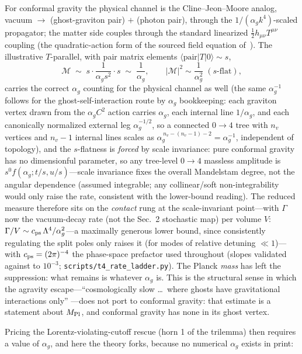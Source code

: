 \documentclass[11pt]{article}
\theoremstyle{definition}
\theoremstyle{remark}
\newcommand{\ag}{\alpha_g}
\begin{document}
For conformal gravity the physical channel is the
Cline--Jeon--Moore analog, vacuum $\to$ (ghost-graviton pair) $+$
(photon pair), through the $1/(\ag k^{4})$-scaled propagator; the
matter side couples through the standard linearized
$\tfrac12 h_{\mu\nu}T^{\mu\nu}$ coupling (the quadratic-action form
of the sourced field equation of~\cite{Mannheim2011}). The
illustrative $T$-parallel, with pair matrix elements
$\langle\text{pair}|T|0\rangle\sim s$,
\begin{equation}
\mathcal M\;\sim\;s\cdot\frac{1}{\ag s^{2}}\cdot s\;\sim\;
\frac{1}{\ag},
\qquad
|\mathcal M|^{2}\sim\frac{1}{\ag^{2}}\;(\text{$s$-flat}),
\end{equation}
carries the correct $\ag$ counting for the physical channel as well
(the same $\ag^{-1}$ follows for the ghost-self-interaction route by
$\ag$ bookkeeping: each graviton vertex drawn from the $\ag C^{2}$
action carries $\ag$, each internal line $1/\ag$, and each
canonically normalized external leg $\ag^{-1/2}$, so a connected
$0\to4$ tree with $n_v$ vertices and $n_v{-}1$ internal lines scales as
$\ag^{\,n_v-(n_v-1)-2}=\ag^{-1}$, independent of topology), and the
$s$-flatness is \emph{forced} by scale invariance: pure conformal
gravity has no dimensionful parameter, so any tree-level $0\to4$
massless amplitude is $s^{0}f(\ag;t/s,u/s)$---scale invariance fixes
the overall Mandelstam degree, not the angular dependence (assumed
integrable; any collinear/soft non-integrability would only raise the
rate, consistent with the lower-bound reading). The reduced measure therefore
sits on the \emph{contact} rung at the scale-invariant point---with
$\Gamma$ now the vacuum-decay rate (not the Sec.~2 stochastic map) per
volume $V$:
$\Gamma/V\sim c_{\rm ps}\,\Lambda^{4}/\ag^{2}$---a maximally generous
lower bound, since consistently regulating the split poles only raises
it (for modes of relative detuning $\ll1$)---with
$c_{\rm ps}=(2\pi)^{-4}$ the phase-space prefactor used throughout
(slopes validated against \cite{instantaneous} to $10^{-3}$;
\texttt{scripts/t4\_rate\_ladder.py}). The Planck \emph{mass} has left the
suppression: what remains is whatever $\ag$ is. This is the
structural sense in which the agravity escape---``cosmologically
slow \dots\ where ghosts have gravitational interactions only''
\cite{GSTZ2021}---does not port to conformal gravity: that estimate
is a statement about $M_{\rm Pl}$, and conformal gravity has none in
its ghost vertex.

Pricing the Lorentz-violating-cutoff rescue (horn 1 of the
trilemma) then requires a value of $\ag$, and here the theory
forks, because no numerical $\ag$ exists in print:
\end{document}
